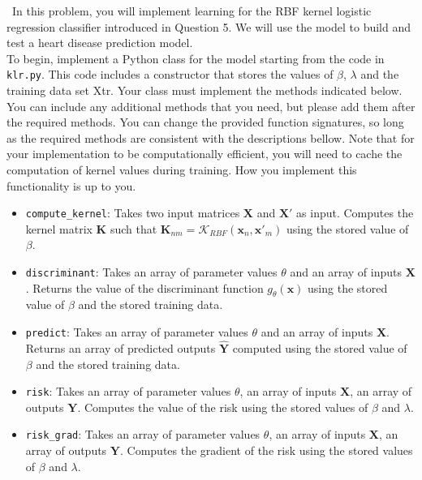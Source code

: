 \documentclass[11pt]{article}
\newcommand{\mbf}[1]{{\mathbf{#1}}}
\begin{document}
\begin{problem}{50} ~In this problem, you will implement learning for the RBF kernel logistic regression classifier introduced in Question 5. We will use the model to build and test a heart disease prediction model.\\

To begin, implement a Python class for the model starting from the code in \verb|klr.py|. This code includes a constructor that stores the values of $\beta$, $\lambda$ and the training data set Xtr. Your class must implement the methods indicated below. You can include any additional methods that you need, but please add them after the required methods. You can change the provided function signatures, so long as the required methods are consistent with the descriptions bellow. Note that for your implementation to be computationally efficient, you will need to cache the computation of kernel values during training. How you implement this functionality is up to you. 
    
\begin{itemize}

\item \verb|compute_kernel|: Takes two input matrices $\mbf{X}$ and $\mbf{X}'$ as input. Computes the kernel matrix $\mbf{K}$ such that $\mbf{K}_{nm} = \mathcal{K}_{RBF}(\mbf{x}_n,\mbf{x}'_m)$ using the stored value of $\beta$.   

\item \verb|discriminant|: Takes an array of parameter values $\theta$ and an array of inputs $\mbf{X}$. Returns the value of the discriminant function $g_{\theta}(\mbf{x})$ using the stored value of $\beta$ and the stored training data.

\item   \verb|predict|: Takes an array of parameter values $\theta$ and an array of inputs $\mbf{X}$. Returns an array of predicted outputs $\hat{\mbf{Y}}$ computed using the stored value of $\beta$ and the stored training data.

\item  \verb|risk|: Takes an array of parameter values $\theta$, an array of inputs $\mbf{X}$, an array of outputs $\mbf{Y}$. Computes the value of the risk using the stored values of $\beta$ and $\lambda$.

\item  \verb|risk_grad|: Takes an array of parameter values $\theta$, an array of inputs $\mbf{X}$, an array of outputs $\mbf{Y}$. Computes the gradient of the  risk using the stored values of $\beta$ and $\lambda$.


\end{itemize}
\end{problem}
\end{document}
